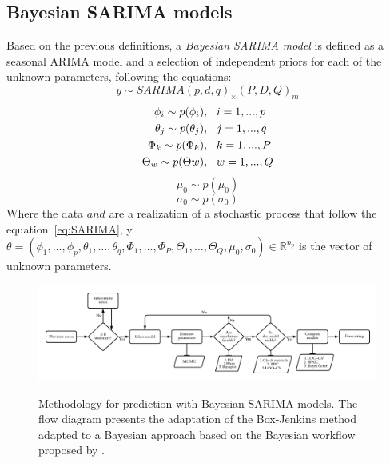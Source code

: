\subsection{Bayesian SARIMA models} \label{sarimab}
Based on the previous definitions, a \textit{Bayesian SARIMA model} is defined as a seasonal ARIMA model and a selection of independent priors for each of the unknown parameters, following the equations:
%
$$y \sim SARIMA(p,d,q)_\times(P,D,Q)_m$$
\begin{align*}
	\phi_i \sim p(\phi_i),& \hspace{0.3cm} i=1,...,p\\
	\theta_j \sim p(\theta_j),& \hspace{0.3cm} j=1,...,q\\
	\Phi_k \sim p(\Phi_k),& \hspace{0.3cm} k=1,...,P\\
	\Theta_w \sim p(\Theta w),& \hspace{0.3cm} w=1,...,Q
\end{align*}
$$\mu_0 \sim p(\mu_0)$$
$$\sigma_0 \sim p(\sigma_0)$$
%
Where the data $ and $ are a realization of a stochastic process that follow the equation~\eqref{eq:SARIMA}, y $\theta = (\phi_1,\ldots,\phi_p,\theta_1,\ldots,\theta_q,\Phi_1,\ldots,\Phi_P,\Theta_1,\ldots,\Theta_Q,\mu_0,\sigma_0) \in \mathbb{R}^{n_p}$ is the vector of unknown parameters.
%
\begin{figure}
	\centering
	\includegraphics[scale=0.5]{Figs/BBJ1}
	\label{fig:BBJ1}
	\caption{Methodology for prediction with Bayesian SARIMA models. The flow diagram presents the adaptation of the Box-Jenkins method adapted to a Bayesian approach based on the Bayesian workflow proposed by \citet{Aki}.}
\end{figure}
%
